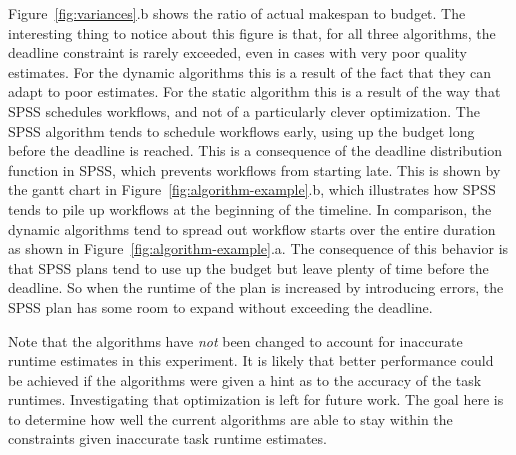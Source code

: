 \documentclass[conference]{IEEEtran}
\begin{document}

Figure~\ref{fig:variances}.b shows the ratio of actual makespan to budget. The
interesting thing to notice about this figure is that, for all three
algorithms, the deadline constraint is rarely exceeded, even in cases with
very poor quality estimates. For the dynamic algorithms this is a result of
the fact that they can adapt to poor estimates. For the static algorithm this
is a result of the way that SPSS schedules workflows, and not of a
particularly clever optimization. The SPSS algorithm tends to schedule
workflows early, using up the budget long before the deadline is reached. This
is a consequence of the deadline distribution function in SPSS, which prevents
workflows from starting late. This is shown by the gantt chart in
Figure~\ref{fig:algorithm-example}.b, which illustrates how SPSS tends to pile
up workflows at the beginning of the timeline. In comparison, the dynamic
algorithms tend to spread out workflow starts over the entire duration as
shown in Figure~\ref{fig:algorithm-example}.a. The consequence of this
behavior is that SPSS plans tend to use up the budget but leave plenty of time
before the deadline. So when the runtime of the plan is increased by
introducing errors, the SPSS plan has some room to expand without exceeding
the deadline.

Note that the algorithms have \textit{not} been changed to account for
inaccurate runtime estimates in this experiment. It is likely that better
performance could be achieved if the algorithms were given a hint as to the
accuracy of the task runtimes. Investigating that optimization is left for
future work. The goal here is to determine how well the current algorithms are
able to stay within the constraints given inaccurate task runtime estimates.

\end{document}
